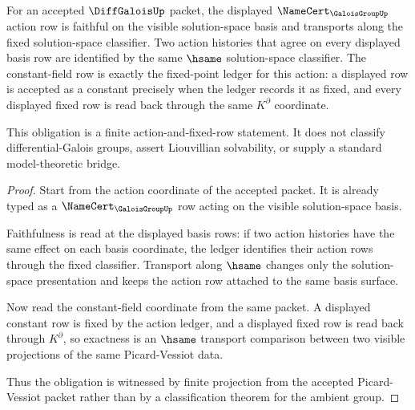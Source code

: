 \begin{theorem}
\label{thm:diffgalois-faithful-action-constant-field-exactness}
For an accepted $\DiffGaloisUp$ packet, the displayed
$\NameCert_{\GaloisGroupUp}$ action row is faithful on the visible
solution-space basis and transports along the fixed solution-space classifier.
Two action histories that agree on every displayed basis row are identified by
the same $\hsame$ solution-space classifier. The constant-field row is exactly
the fixed-point ledger for this action: a displayed row is accepted as a
constant precisely when the ledger records it as fixed, and every displayed
fixed row is read back through the same $K^\partial$ coordinate.

This obligation is a finite action-and-fixed-row statement. It does not
classify differential-Galois groups, assert Liouvillian solvability, or supply
a standard model-theoretic bridge.
\end{theorem}
\begin{proof}
Start from the action coordinate of the accepted packet. It is already typed
as a $\NameCert_{\GaloisGroupUp}$ row acting on the visible solution-space
basis.

Faithfulness is read at the displayed basis rows: if two action histories have
the same effect on each basis coordinate, the ledger identifies their action
rows through the fixed classifier. Transport along $\hsame$ changes only the
solution-space presentation and keeps the action row attached to the same
basis surface.

Now read the constant-field coordinate from the same packet. A displayed
constant row is fixed by the action ledger, and a displayed fixed row is read
back through $K^\partial$, so exactness is an $\hsame$ transport comparison
between two visible projections of the same Picard-Vessiot data.

Thus the obligation is witnessed by finite projection from the accepted
Picard-Vessiot packet rather than by a classification theorem for the ambient
group.
\end{proof}

